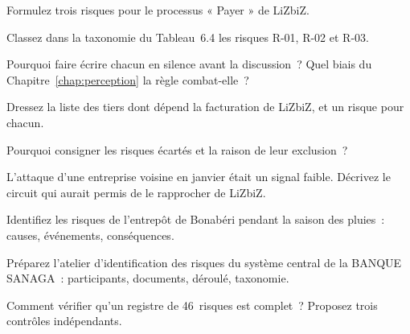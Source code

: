 \begin{boxexo}[title={\ding{45}\quad Exercice~6.2. Formuler \niveaubase}]
Formulez trois risques pour le processus « Payer » de LiZbiZ.
\end{boxexo}

\begin{boxexo}[title={\ding{45}\quad Exercice~6.3. Classer \niveaubase}]
Classez dans la taxonomie du Tableau~6.4 les risques R-01, R-02 et R-03.
\end{boxexo}

\begin{boxexo}[title={\ding{45}\quad Exercice~6.4. L'atelier \niveaumoyen}]
Pourquoi faire écrire chacun en silence avant la discussion~? Quel biais
du Chapitre~\ref{chap:perception} la règle combat-elle~?
\end{boxexo}

\begin{boxexo}[title={\ding{45}\quad Exercice~6.5. Les tiers \niveaumoyen}]
Dressez la liste des tiers dont dépend la facturation de LiZbiZ, et un
risque pour chacun.
\end{boxexo}

\begin{boxexo}[title={\ding{45}\quad Exercice~6.6. Écarter \niveaumoyen}]
Pourquoi consigner les risques écartés et la raison de leur exclusion~?
\end{boxexo}

\begin{boxexo}[title={\ding{45}\quad Exercice~6.7. Signal faible \niveaumoyen}]
L'attaque d'une entreprise voisine en janvier était un signal faible.
Décrivez le circuit qui aurait permis de le rapprocher de LiZbiZ.
\end{boxexo}

\begin{boxexo}[title={\ding{45}\quad Exercice~6.8. Inondation \niveaumoyen}]
Identifiez les risques de l'entrepôt de Bonabéri pendant la saison des
pluies~: causes, événements, conséquences.
\end{boxexo}

\begin{boxexo}[title={\ding{45}\quad Exercice~6.9. Une banque \niveauexpert}]
Préparez l'atelier d'identification des risques du système central de la
BANQUE SANAGA~: participants, documents, déroulé, taxonomie.
\end{boxexo}

\begin{boxexo}[title={\ding{45}\quad Exercice~6.10. Complétude \niveauexpert}]
Comment vérifier qu'un registre de 46~risques est complet~? Proposez trois
contrôles indépendants.
\end{boxexo}

